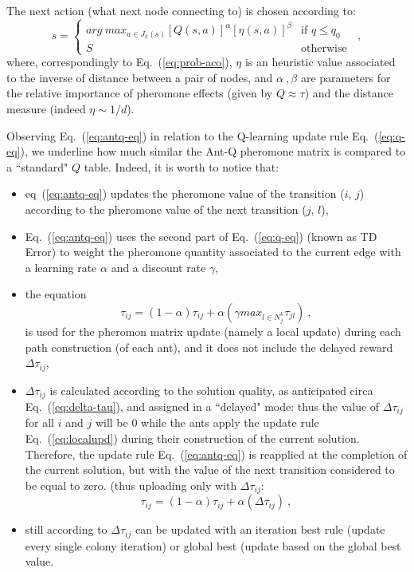 \documentclass[10pt]{article}
\begin{document}
The next action (what next node connecting to) is chosen according to:
\begin{equation}
s = \begin{cases} arg~max_{a \in J_k(s)} [Q(s,a)]^\alpha [\eta(s,a)]^\beta & \mbox{if } q \leq q_0 \\ S & \mbox{otherwise } \end{cases} ~,
\label{eq:antq-choice}
\end{equation}
where, correspondingly to Eq.~(\ref{eq:prob-aco}), $\eta$ is an heuristic value associated to the inverse of distance between a pair of nodes, and $\alpha~, \beta$ are parameters for the relative importance of pheromone effects (given by $Q \approx \tau$) and the distance measure (indeed $\eta \sim 1/d$).

Observing Eq.~(\ref{eq:antq-eq}) in relation to the Q-learning update rule Eq.~(\ref{eq:q-eq}), we underline how much similar the Ant-Q pheromone matrix is compared to a ``standard" $Q$ table. Indeed, it is worth to notice that:
\begin{itemize}
\item  eq~(\ref{eq:antq-eq})  updates the pheromone  value  of  the  transition  ($i$, $j$)  according to the  pheromone  value  of  the  next transition  ($j$, $ l$),
\item Eq.~(\ref{eq:antq-eq}) uses  the second part of Eq.~(\ref{eq:q-eq}) (known as TD Error) to  weight the  pheromone  quantity associated  to  the current  edge  with  a learning  rate $\alpha$  and  a discount  rate $\gamma$, 
\item the equation 
\begin{equation}
\tau_{ij}= (1-\alpha) \tau_{ij} + \alpha(\gamma max_{l\in N^k_j}\tau_{jl}) ~,
\label{eq:localupd}
\end{equation}
is used for the pheromon matrix update (namely a local update) during each path construction (of each ant), and it does not include the delayed reward $\Delta \tau_{ij}$,
\item $\Delta \tau_{ij}$ is calculated according to the solution quality, as anticipated circa Eq.~(\ref{eq:delta-tau}), and assigned in a ``delayed" mode: thus the value of $\Delta \tau_{ij}$  for all $i$ and $j$ will be $0$ while the ants  apply  the  update  rule Eq.~(\ref{eq:localupd})  during  their  construction  of the  current solution. 
Therefore, the update rule Eq.~(\ref{eq:antq-eq}) is reapplied at the completion of the current solution, but with the value of the next transition considered to be equal to zero. (thus uploading only with $\Delta \tau_{ij}$:
\begin{equation}
\tau_{ij}= (1-\alpha) \tau_{ij} + \alpha(\Delta\tau_{ij}) ~,
\label{eq:antq-delay}
\end{equation}

\item still according to \cite{undici} \cite{diciotto} $\Delta \tau_{ij}$ can be updated with an iteration  best  rule (update every single colony iteration) or  global  best (update based on the global best value.
\end{itemize}
\end{document}

